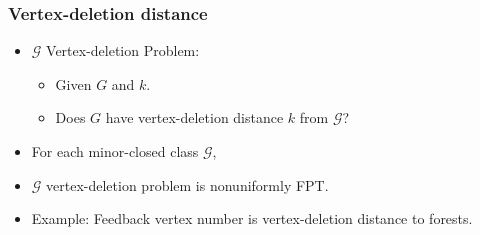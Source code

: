 \documentclass[t,usenames,dvipsnames]{beamer}
\begin{document}
\begin{frame}\frametitle{Vertex-deletion distance}
	\begin{itemize}[<+->]
		\item $\mathcal{G}$ Vertex-deletion Problem:
			\begin{itemize}
				\item Given $G$ and $k$.
				\item Does $G$ have vertex-deletion distance $k$ from $\mathcal{G}$?
			\end{itemize}
		\item For each minor-closed class $\mathcal{G}$, 
		\item[] \hspace{1cm} $\mathcal{G}$ vertex-deletion problem is nonuniformly FPT.
		\item Example: Feedback vertex number is vertex-deletion distance to forests.
	\end{itemize}
	\vfill
	\vfill
	\hfill
\end{frame}
\end{document}
